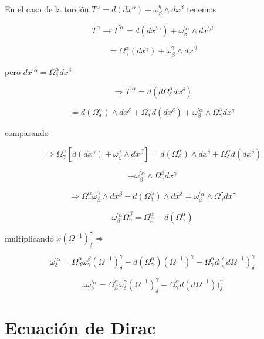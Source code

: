 \documentclass{report}
\begin{document}
{En el caso de la torsión $T^{\alpha } = d(dx^{\alpha }) + \omega _{\beta}^{\eta } \wedge d x^{\beta}$ tenemos

\[T^{\alpha} \rightarrow T^{\prime \alpha }= d(dx^{\prime \alpha})+\omega _{\beta}^{\prime \alpha} \wedge dx^{\prime \beta}\]

\[= \Omega_{\gamma}^{\alpha} (dx^{\gamma}) + \omega_{\beta}^{\gamma} \wedge dx^{\beta } \]

pero $dx^{\prime \alpha}=\Omega _{\delta}^{\alpha} dx^{\delta}$

\[\Rightarrow T^{\prime \alpha} = d(d\Omega_{\delta}^{\alpha} dx^{\delta}) \]

\[= d(\Omega_{\delta}^{\alpha}) \wedge dx^{\delta}+\Omega_{\delta}^{\alpha}d(dx^{\delta}) +\omega _{\beta}^{\prime \alpha} \wedge \Omega _{\gamma}^{\beta}dx^{\gamma }\]

comparando

\[\Rightarrow\Omega_{\gamma}^{\alpha} [d(dx^{\gamma})+\omega_{\beta} ^{\gamma}\wedge dx^{\beta}] =d(\Omega _{\delta}^{\alpha})\wedge d x^{\delta} + \Omega_{\delta}^{\alpha}d (dx^{\delta}) \]

\[+ \omega_{\beta}^{\prime \alpha} \wedge \Omega _{\gamma}^{\beta} dx^{\gamma}\]

\[\Rightarrow \Omega _{\gamma}^{\alpha}\omega _{\beta}^{\gamma}\wedge dx^{\beta}-d (\Omega _{\delta}^{\alpha}) \wedge dx^{\delta} = \omega_{\beta}^{\prime \alpha}\wedge \Omega_{\gamma}^{\because}dx^{\gamma}\]

\[\omega _{\beta}^{\prime \alpha} \Omega_{\gamma}^{\beta} = \Omega_{\beta}^{\alpha}- d(\Omega_{\gamma}^{\alpha}) \]

multiplicando $x (\Omega^{-1})_{\delta}^{\gamma} \Rightarrow$

\[\omega_{\delta}^{\prime \alpha} = \Omega _{\beta}^{\alpha}\omega_{\gamma}^{\beta} (\Omega ^{-1})_{\delta}^{\gamma} - d (\Omega_{\gamma}^{\alpha}) (\Omega ^{-1})^{\gamma} - \Omega_{\gamma}^{\alpha}d(d\Omega^{-1})_{\delta}^{\gamma}\]

\begin{equation}
\therefore \omega_{\delta}^{\prime \alpha}=\Omega_{\beta}^{\alpha} \omega_{\delta}^{\gamma}(\Omega^{-1})_{\delta}^{\gamma}+\Omega_{\gamma}^{\alpha}d(d \Omega^{-1}))_{\delta}^{\gamma}
\end{equation}

\section{Ecuación de Dirac}

}
\end{document}
